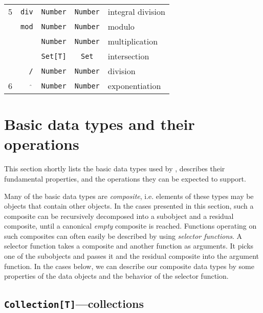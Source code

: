 \begin{center}
\begin{tabular}[h]{|c|r|c|c|p{3.5cm}|}
5 & {\tt div}   & {\tt Number} & {\tt Number} & integral division \\ \cline{2-5}
  & {\tt mod}   & {\tt Number} & {\tt Number} & modulo \\ \cline{2-5}
  & {\tt *}     & {\tt Number} & {\tt Number} & multiplication \\ \cline{3-5}
  &             & {\tt Set[T]} & {\tt Set} & intersection \\ \cline{2-5}
  & {\tt /}     & {\tt Number} & {\tt Number} & division \\ \hline

6 & $\widehat{\ }$  & {\tt Number} & {\tt Number} & exponentiation \\ \hline

\end{tabular}
\end{center}



\section{Basic data types and their operations}\label{app:BasicTypes}

This section shortly lists the basic data types used by \Cal,
describes their fundamental properties, and the operations they can be
expected to support.

Many of the basic data types are {\em composite}, i.e. elements of
these types may be objects that contain other objects. In the cases
presented in this section, such a composite can be recursively
decomposed into a subobject and a residual composite, until a
canonical {\em empty} composite is reached. Functions operating on
such composites can often easily be described by
using {\em selector
  functions}. A selector function takes a composite and another
function as arguments. It picks one of the subobjects and passes it
and the residual composite into the argument function. In the cases
below, we can describe our composite data types by some properties of
the data objects and the behavior of the selector function.


\subsection{{\tt Collection[T]}---collections}\label{sect:Collections}


